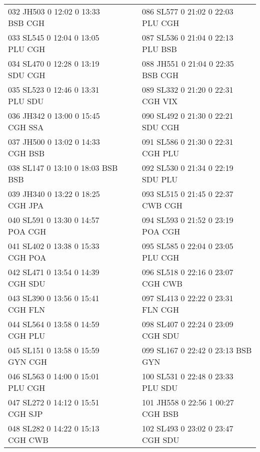 \begin{scriptsize}
\begin{longtable}{l c c l}
032 JH503  0 12:02 0 13:33 BSB CGH & & & 086 SL577  0 21:02 0 22:03 PLU CGH \\

033 SL545  0 12:04 0 13:05 PLU CGH & & & 087 SL536  0 21:04 0 22:13 PLU BSB \\

034 SL470  0 12:28 0 13:19 SDU CGH & & & 088 JH551  0 21:04 0 22:35 BSB CGH \\

035 SL523  0 12:46 0 13:31 PLU SDU & & & 089 SL332  0 21:20 0 22:31 CGH VIX \\

036 JH342  0 13:00 0 15:45 CGH SSA & & & 090 SL492  0 21:30 0 22:21 SDU CGH \\

037 JH500  0 13:02 0 14:33 CGH BSB & & & 091 SL586  0 21:30 0 22:31 CGH PLU \\

038 SL147  0 13:10 0 18:03 BSB BSB & & & 092 SL530  0 21:34 0 22:19 SDU PLU \\

039 JH340  0 13:22 0 18:25 CGH JPA & & & 093 SL515  0 21:45 0 22:37 CWB CGH \\

040 SL591  0 13:30 0 14:57 POA CGH & & & 094 SL593  0 21:52 0 23:19 POA CGH \\

041 SL402  0 13:38 0 15:33 CGH POA & & & 095 SL585  0 22:04 0 23:05 PLU CGH \\

042 SL471  0 13:54 0 14:39 CGH SDU & & & 096 SL518  0 22:16 0 23:07 CGH CWB \\

043 SL390  0 13:56 0 15:41 CGH FLN & & & 097 SL413  0 22:22 0 23:31 FLN CGH \\

044 SL564  0 13:58 0 14:59 CGH PLU & & & 098 SL407  0 22:24 0 23:09 CGH SDU \\

045 SL151  0 13:58 0 15:59 GYN CGH & & & 099 SL167  0 22:42 0 23:13 BSB GYN \\

046 SL563  0 14:00 0 15:01 PLU CGH & & & 100 SL531  0 22:48 0 23:33 PLU SDU \\

047 SL272  0 14:12 0 15:51 CGH SJP & & & 101 JH558  0 22:56 1 00:27 CGH BSB \\

048 SL282  0 14:22 0 15:13 CGH CWB & & & 102 SL493  0 23:02 0 23:47 CGH SDU \\


\end{longtable}
\end{scriptsize}
